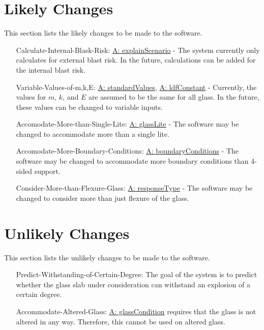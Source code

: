 \documentclass[12pt]{article}
\begin{document}
\section{Likely Changes}
\label{Sec:LCs}
This section lists the likely changes to be made to the software.
\begin{itemize}
\item[Calculate-Internal-Blask-Risk:\phantomsection\label{calcInternalBlastRisk}]{\hyperref[assumpES]{A: explainScenario} - The system currently only calculates for external blast risk. In the future, calculations can be added for the internal blast risk.}
\item[Variable-Values-of-m,k,E:\phantomsection\label{varValsOfmkE}]{\hyperref[assumpSV]{A: standardValues}, \hyperref[assumpLDFC]{A: ldfConstant} - Currently, the values for $m$, $k$, and $E$ are assumed to be the same for all glass. In the future, these values can be changed to variable inputs.}
\item[Accomodate-More-than-Single-Lite:\phantomsection\label{accMoreThanSingleLite}]{\hyperref[assumpGL]{A: glassLite} - The software may be changed to accommodate more than a single lite.}
\item[Accomodate-More-Boundary-Conditions:\phantomsection\label{accMoreBoundaryConditions}]{\hyperref[assumpBC]{A: boundaryConditions} - The software may be changed to accommodate more boundary conditions than 4-sided support.}
\item[Consider-More-than-Flexure-Glass:\phantomsection\label{considerMoreThanFlexGlass}]{\hyperref[assumpRT]{A: responseType} - The software may be changed to consider more than just flexure of the glass.}
\end{itemize}
\section{Unlikely Changes}
\label{Sec:UCs}
This section lists the unlikely changes to be made to the software.
\begin{itemize}
\item[Predict-Withstanding-of-Certain-Degree:\phantomsection\label{predictWithstandOfCertDeg}]{The goal of the system is to predict whether the glass slab under consideration can withstand an explosion of a certain degree.}
\item[Accommodate-Altered-Glass:\phantomsection\label{accAlteredGlass}]{\hyperref[assumpGC]{A: glassCondition} requires that the glass is not altered in any way. Therefore, this cannot be used on altered glass.}
\end{itemize}
\end{document}
